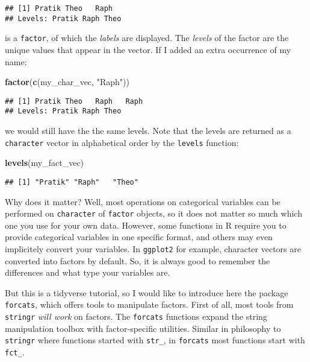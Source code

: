 \documentclass[
]{book}
\newenvironment{Shaded}{}{}
\newcommand{\KeywordTok}[1]{\textcolor[rgb]{0.00,0.44,0.13}{\textbf{#1}}}
\newcommand{\NormalTok}[1]{#1}
\newcommand{\StringTok}[1]{\textcolor[rgb]{0.25,0.44,0.63}{#1}}
\begin{document}
\begin{verbatim}
## [1] Pratik Theo   Raph  
## Levels: Pratik Raph Theo
\end{verbatim}

is a \texttt{factor}, of which the \emph{labels} are displayed. The \emph{levels} of the factor are the unique values that appear in the vector. If I added an extra occurrence of my name:

\begin{Shaded}
\begin{Highlighting}[]
\KeywordTok{factor}\NormalTok{(}\KeywordTok{c}\NormalTok{(my_char_vec, }\StringTok{"Raph"}\NormalTok{))}
\end{Highlighting}
\end{Shaded}

\begin{verbatim}
## [1] Pratik Theo   Raph   Raph  
## Levels: Pratik Raph Theo
\end{verbatim}

we would still have the the same levels. Note that the levels are returned as a \texttt{character} vector in alphabetical order by the \texttt{levels} function:

\begin{Shaded}
\begin{Highlighting}[]
\KeywordTok{levels}\NormalTok{(my_fact_vec)}
\end{Highlighting}
\end{Shaded}

\begin{verbatim}
## [1] "Pratik" "Raph"   "Theo"
\end{verbatim}

Why does it matter? Well, most operations on categorical variables can be performed on \texttt{character} of \texttt{factor} objects, so it does not matter so much which one you use for your own data. However, some functions in R require you to provide categorical variables in one specific format, and others may even implicitely convert your variables. In \texttt{ggplot2} for example, character vectors are converted into factors by default. So, it is always good to remember the differences and what type your variables are.

But this is a tidyverse tutorial, so I would like to introduce here the package \texttt{forcats}, which offers tools to manipulate factors. First of all, most tools from \texttt{stringr} \emph{will work} on factors. The \texttt{forcats} functions expand the string manipulation toolbox with factor-specific utilities. Similar in philosophy to \texttt{stringr} where functions started with \texttt{str\_}, in \texttt{forcats} most functions start with \texttt{fct\_}.
\end{document}
